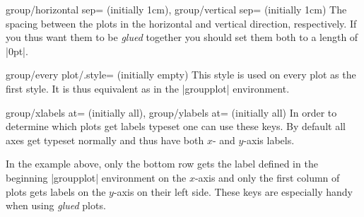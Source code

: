 {\begin{pgfplotskeylist}{%
    group/horizontal sep= (initially 1cm),
    group/vertical sep= (initially 1cm)%
}
    The spacing between the plots in the horizontal and vertical direction,
    respectively. If you thus want them to be \textit{glued} together you
    should set them both to a length of |0pt|.
\end{pgfplotskeylist}

\begin{pgfplotskey}{group/every plot/.style= (initially empty)}
    This style is used on every plot as the first style. It is thus equivalent
    as  in the |groupplot| environment.
\end{pgfplotskey}

\begin{pgfplotskeylist}{%
    group/xlabels at= (initially all),
    group/ylabels at= (initially all)%
}
    In order to determine which plots get labels typeset one can use these
    keys. By default all axes get typeset normally and thus have both $x$- and
    $y$-axis labels.
\begin{codeexample}[]
\end{codeexample}
    In the example above, only the bottom row gets the label defined in the
    beginning |groupplot| environment on the $x$-axis and only the first column
    of plots gets labels on the $y$-axis on their left side. These keys are
    especially handy when using \textit{glued} plots.
\end{pgfplotskeylist}

}
